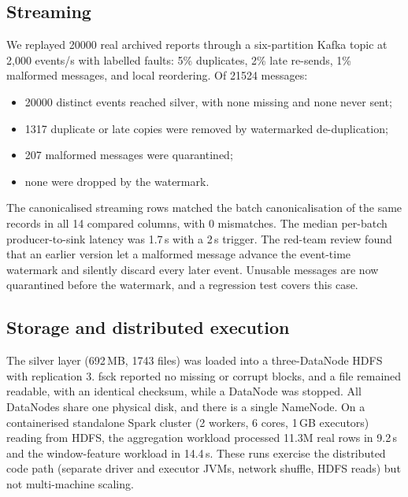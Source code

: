 \documentclass[10pt]{article}
\begin{document}
\subsection{Streaming}
We replayed \num{20000} real archived reports through a six-partition Kafka topic at 2,000 events/s with labelled faults: 5\% duplicates, 2\% late re-sends, 1\% malformed messages, and local reordering.
Of \num{21524} messages:
\begin{itemize}
  \item \num{20000} distinct events reached silver, with none missing and none never sent;
  \item \num{1317} duplicate or late copies were removed by watermarked de-duplication;
  \item 207 malformed messages were quarantined;
  \item none were dropped by the watermark.
\end{itemize}
The canonicalised streaming rows matched the batch canonicalisation of the same records in all 14 compared columns, with 0 mismatches.
The median per-batch producer-to-sink latency was 1.7\,s with a 2\,s trigger.
The red-team review found that an earlier version let a malformed message advance the event-time watermark and silently discard every later event. Unusable messages are now quarantined before the watermark, and a regression test covers this case.

\subsection{Storage and distributed execution}
The silver layer (692\,MB, \num{1743} files) was loaded into a three-DataNode HDFS with replication 3.
fsck reported no missing or corrupt blocks, and a file remained readable, with an identical checksum, while a DataNode was stopped.
All DataNodes share one physical disk, and there is a single NameNode.
On a containerised standalone Spark cluster (2 workers, 6 cores, 1\,GB executors) reading from HDFS, the aggregation workload processed 11.3M real rows in 9.2\,s and the window-feature workload in 14.4\,s.
These runs exercise the distributed code path (separate driver and executor JVMs, network shuffle, HDFS reads) but not multi-machine scaling.
\end{document}
